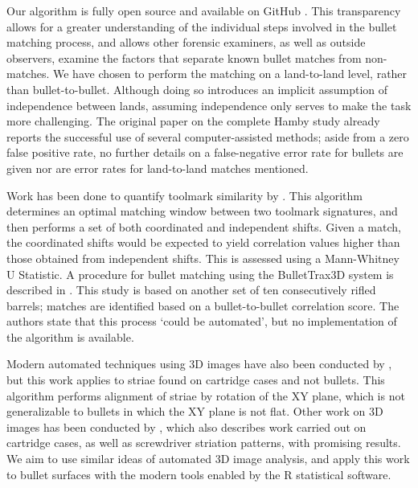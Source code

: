 \documentclass[aoas, preprint]{imsart}\usepackage[]{graphicx}\usepackage[]{color}
\begin{document}
Our algorithm is fully open source and available on GitHub \citep{x3prplus}. This transparency allows for a greater understanding of the individual steps involved in the bullet matching process, and allows other forensic examiners, as well as outside observers, examine the factors that separate known bullet matches from non-matches. We have chosen to perform the matching on a land-to-land level, rather than bullet-to-bullet. Although doing so introduces an implicit assumption of independence between lands, assuming independence only serves to make the task more challenging.
The original paper on the complete Hamby study already reports the successful use of several computer-assisted methods; aside from a zero false positive rate, no further details on a false-negative error rate for bullets are given nor are error rates for land-to-land matches mentioned. 
 
Work has been done to quantify toolmark similarity by \citet{lock2013significance}. This algorithm determines an optimal matching window between two toolmark signatures, and then performs a set of both coordinated and independent shifts. Given a match, the coordinated shifts would be expected to yield correlation values higher than those obtained from independent shifts. This is assessed using a Mann-Whitney U Statistic. A procedure for bullet matching using the BulletTrax3D system is described in \citet{roberge:2006}. This study is based on another set of ten consecutively rifled barrels; matches are identified based on a bullet-to-bullet correlation score. The authors state that this process `could be automated', but no implementation of the algorithm is available. 

Modern automated techniques using 3D images have also been conducted by \citet{riva:2014}, but this work applies to striae found on cartridge cases and not bullets. This algorithm performs alignment of striae by rotation of the XY plane, which is not generalizable to bullets in which the XY plane is not flat. Other work on 3D images has been conducted by \citet{petraco:2012}, which also describes work carried out on cartridge cases, as well as screwdriver striation patterns, with promising results. We aim to use similar ideas of automated 3D image analysis, and apply this work to bullet surfaces with the modern tools enabled by the R statistical software.
\end{document}
